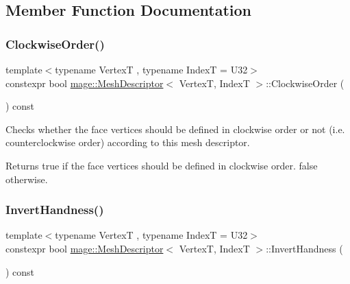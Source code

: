 \subsection{Member Function Documentation}
\hypertarget{classmage_1_1_mesh_descriptor_a4694588682a42e5abf7c10e33a48d9bf}{}\label{classmage_1_1_mesh_descriptor_a4694588682a42e5abf7c10e33a48d9bf} 
\subsubsection{\texorpdfstring{Clockwise\+Order()}{ClockwiseOrder()}}
{\footnotesize\ttfamily template$<$typename VertexT , typename IndexT  = U32$>$ \\
constexpr bool \hyperlink{classmage_1_1_mesh_descriptor}{mage\+::\+Mesh\+Descriptor}$<$ VertexT, IndexT $>$\+::Clockwise\+Order (\begin{DoxyParamCaption}{ }\end{DoxyParamCaption}) const\hspace{0.3cm}{\ttfamily [noexcept]}}

Checks whether the face vertices should be defined in clockwise order or not (i.\+e. counterclockwise order) according to this mesh descriptor.

\begin{DoxyReturn}{Returns}
{\ttfamily true} if the face vertices should be defined in clockwise order. {\ttfamily false} otherwise. 
\end{DoxyReturn}
\hypertarget{classmage_1_1_mesh_descriptor_a570ac8d10bafca62cc24226434c817e8}{}\label{classmage_1_1_mesh_descriptor_a570ac8d10bafca62cc24226434c817e8} 
\subsubsection{\texorpdfstring{Invert\+Handness()}{InvertHandness()}}
{\footnotesize\ttfamily template$<$typename VertexT , typename IndexT  = U32$>$ \\
constexpr bool \hyperlink{classmage_1_1_mesh_descriptor}{mage\+::\+Mesh\+Descriptor}$<$ VertexT, IndexT $>$\+::Invert\+Handness (\begin{DoxyParamCaption}{ }\end{DoxyParamCaption}) const\hspace{0.3cm}{\ttfamily [noexcept]}}

